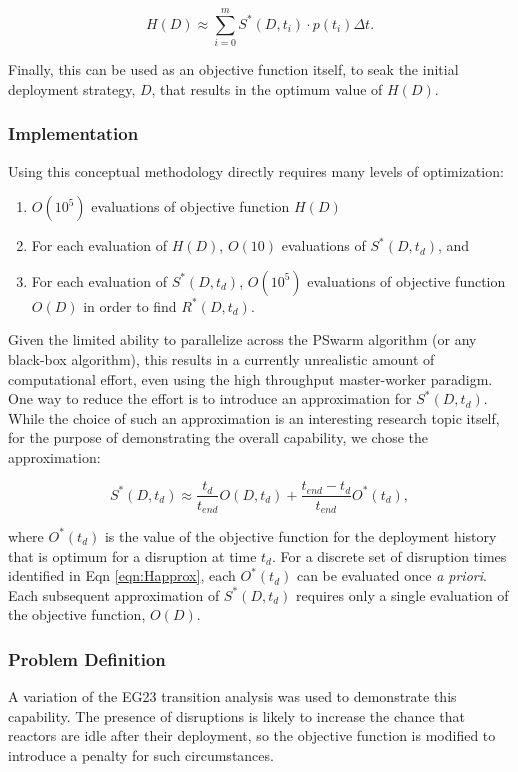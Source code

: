 \begin{equation}
  H(D) \approx \sum_{i=0}^m S^*(D,t_i) \cdot p(t_i) \Delta t. \label{eqn:Happrox}
\end{equation}

Finally, this can be used as an objective function itself, to seak the initial
deployment strategy, $D$, that results in the optimum value of $H(D)$.


\subsubsection{Implementation}

Using this conceptual methodology directly requires many levels of optimization:
\begin{enumerate}
\item $O(10^5)$ evaluations of objective function $H(D)$
\item For each evaluation of $H(D)$, $O(10)$ evaluations of $S^*(D,t_d)$, and
\item For each evaluation of $S^*(D,t_d)$, $O(10^5)$ evaluations of objective
  function $O(D)$ in order to find $R^*(D,t_d)$.
\end{enumerate}

Given the limited ability to parallelize across the PSwarm algorithm (or any
black-box algorithm), this results in a currently unrealistic amount of
computational effort, even using the high throughput master-worker paradigm.
One way to reduce the effort is to introduce an approximation for
$S^*(D,t_d)$.  While the choice of such an approximation is an interesting
research topic itself, for the purpose of demonstrating the overall
capability, we chose the approximation:

$$S^*(D,t_d) \approx \frac{t_d}{t_{end}} O(D,t_d) + \frac{t_{end}-t_d}{t_{end}} O^*(t_d),$$

\noindent where $O^*(t_d)$ is the value of the objective function for the
deployment history that is optimum for a disruption at time $t_d$.  For a
discrete set of disruption times identified in Eqn \ref{eqn:Happrox}, each
$O^*(t_d)$ can be evaluated once \textit{a priori}.  Each subsequent
approximation of $S^*(D,t_d)$ requires only a single evaluation of the
objective function, $O(D)$.


\subsubsection{Problem Definition}

A variation of the EG23 transition analysis was used to demonstrate this
capability.  The presence of disruptions is likely to increase the chance that
reactors are idle after their deployment, so the objective function is
modified to introduce a penalty for such circumstances.

